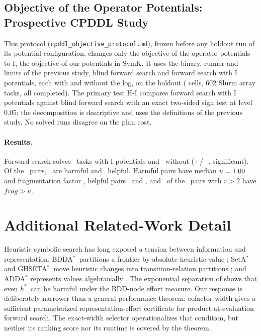 \documentclass[letterpaper]{article}
\newcommand{\num}[1]{\numprint{#1}}
\newcommand{\hstar}{\ensuremath{h^{*}}}
\newcommand{\fragfactor}{\ensuremath{\mathit{frag}}}
\newcommand{\bddastar}{BDDA\ensuremath{^{*}}}
\newcommand{\ghseta}{GHSETA\ensuremath{^{*}}}
\theoremstyle{plain}
\theoremstyle{definition}
\theoremstyle{remark}
\begin{document}
\subsection{Objective of the Operator Potentials: Prospective CPDDL Study}
\label{sec:supp-cpddl-objective}

This protocol (\texttt{cpddl\_\allowbreak objective\_\allowbreak protocol.md}), frozen before any
holdout run of its potential configuration, changes only the objective of
the operator potentials to I, the objective of our potentials in SymK.  It
uses the binary, runner and limits of the previous study, blind forward
search and forward search with I potentials, each with and without the log,
on the holdout (\num{4208} cells, 602 Slurm array tasks, all completed).  The
primary test H-I compares forward search with I potentials against blind
forward search with an exact two-sided sign test at level 0.05; the
decomposition is descriptive and uses the definitions of the previous
study.  No solved runs disagree on the plan cost.

\paragraph{Results.}
Forward search solves \CpISolvedPotFw\ tasks with I potentials and
\CpISolvedBlindFw\ without (+\CpIGains/$-$\CpILosses, significant).  Of the
\CpIPairs\ pairs, \CpIHarmful\ are harmful and \CpIHelpful\ helpful.
Harmful pairs have median $u=1.00$ and fragmentation factor
\CpIHurtFrag, helpful pairs \CpIHelpUnion\ and \CpIHelpFrag, and
\CpIStrongFrag\ of the \CpIStrong\ pairs with $r>2$ have $\fragfactor>u$.

\FloatBarrier
\section{Additional Related-Work Detail}
\label{sec:supp-related}

Heuristic symbolic search has long exposed a tension between information and
representation. \bddastar\ partitions a frontier by absolute heuristic value
\citep{edelkamp-reffel-ki1998}; SetA\ensuremath{^{*}} and \ghseta\ move
heuristic changes into transition-relation partitions
\citep{jensen-et-al-aij2008}; and ADDA\ensuremath{^{*}} represents values
algebraically \citep{hansen-et-al-sara2002}. The exponential separation of
\citet{speck-et-al-icaps2020} shows that even \hstar\ can be harmful under the
BDD-node effort measure. Our response is deliberately narrower than a general
performance theorem: cofactor width gives a sufficient parameterized
representation-effort certificate for product-at-evaluation forward search.
The exact-width selector
operationalizes that condition, but neither its ranking score nor its runtime
is covered by the theorem.
\end{document}
